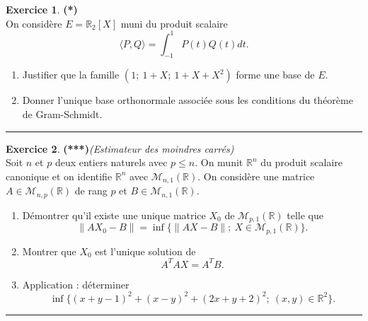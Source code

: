 \documentclass[a4paper,11pt]{article}
\theoremstyle{definition}
\newtheorem{exo}{Exercice} %
\begin{document}
	


\begin{exo}\textbf{(*)}\quad\\[0.25cm]%
	On considère $E = \mathbb R_2[X]$ muni du produit scalaire 
	$$\langle P,Q\rangle=\int_{-1}^1 P(t)Q(t)dt.$$
\begin{enumerate}
	\item Justifier que la famille $\left(1; \ 1+ X; \ 1+X+X^2\right)$ forme une base de $E$.
	\item  Donner l'unique base orthonormale associée sous les conditions du théorème de Gram-Schmidt.
	
\end{enumerate}


	\centering
\rule{1\linewidth}{0.6pt}
\end{exo}

\newpage

\begin{exo}\textbf{(***)}\quad\textit{(Estimateur des moindres carrés)}\\[0.25cm]%
	Soit $n$ et $p$ deux entiers naturels avec $p\leq n$. On munit $\mathbb R^n$ du produit scalaire canonique et on identifie $\mathbb R^n$ avec $\mathcal M_{n,1}(\mathbb R)$. On considère une matrice $A\in\mathcal M_{n,p}(\mathbb R)$ de rang $p$ et $B\in\mathcal M_{n,1}(\mathbb R)$. 
	\begin{enumerate}
		\item Démontrer qu'il existe une unique matrice $X_0$ de $\mathcal M_{p,1}(\mathbb R)$ telle que 
		$$\|AX_0-B\|=\inf\{\|AX-B\|;\ X\in\mathcal M_{p,1}(\mathbb R)\}.$$
		\item Montrer que $X_0$ est l'unique solution de 
		$$A^T AX=A^T B.$$
		\item Application : déterminer 
		$$\inf\{(x+y-1)^2+(x-y)^2+(2x+y+2)^2;\ (x,y)\in\mathbb R^2\}.$$
	\end{enumerate}
	
	\centering
	\rule{1\linewidth}{0.6pt}
\end{exo}


	
\end{document}
